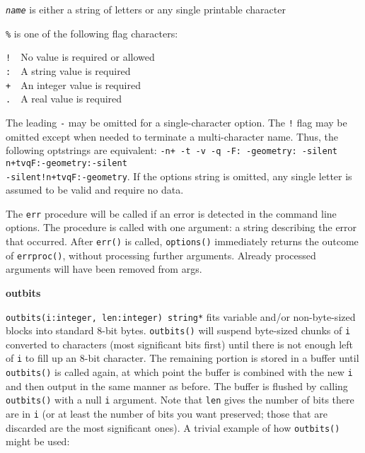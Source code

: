 \texttt{\textit{name}} is either a string of letters or any single
printable character

\texttt{\%} is one of the following flag characters:

\texttt{!}\ \ No value is required or allowed\\
\texttt{:}\ \ A string value is required\\
\texttt{+}\ \ An integer value is required\\
\texttt{.}\ \ A real value is required

The leading \texttt{{\textquotedbl}-{\textquotedbl}} may be omitted for
a single-character option. The \texttt{{\textquotedbl}!{\textquotedbl}}
flag may be omitted except when needed to terminate a multi-character
name. Thus, the following optstrings are equivalent:
\texttt{{\textquotedbl}-n+ -t -v -q -F: -geometry:
-silent{\textquotedbl}}
\texttt{{\textquotedbl}n+tvqF:-geometry:-silent{\textquotedbl}}\\
\texttt{{\textquotedbl}-silent!n+tvqF:-geometry{\textquotedbl}}. If the
options string is omitted, any single letter is assumed to be valid and
require no data.

The \texttt{err} procedure will be called if an error is detected in the
command line options. The procedure is called with one argument: a
string describing the error that occurred. After \texttt{err()} is
called, \texttt{options()} immediately returns the outcome of
\texttt{errproc()}, without processing further arguments. Already
processed arguments will have been removed from args.

{\sffamily\bfseries
outbits}

\texttt{outbits(i:integer, len:integer) string*} fits variable and/or
non-byte-sized blocks into standard 8-bit bytes. \texttt{outbits()}
will suspend byte-sized chunks of \texttt{i} converted to characters
(most significant bits first) until there is not enough left of
\texttt{i} to fill up an 8-bit character. The remaining portion is
stored in a buffer until \texttt{outbits()} is called again, at which
point the buffer is combined with the new \texttt{i} and then output in
the same manner as before. The buffer is flushed by calling
\texttt{outbits()} with a null \texttt{i} argument. Note that
\texttt{len} gives the number of bits there are in \texttt{i} (or at
least the number of bits you want preserved; those that are discarded
are the most significant ones). A trivial example of how
\texttt{outbits()} might be used:


